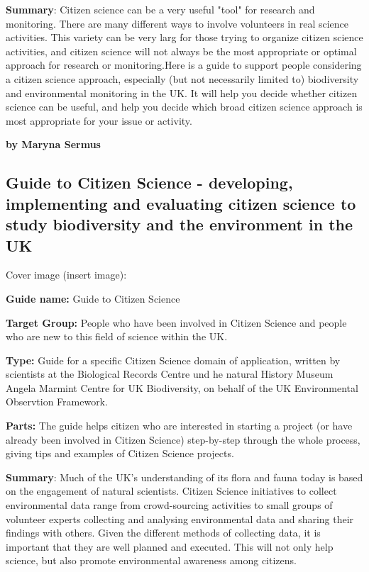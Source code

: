 \documentclass{article}
\begin{document}
\textbf{Summary}: Citizen science can be a very useful "tool" for research and monitoring. There are many different ways to involve volunteers in real science activities. This variety can be very larg for those trying to organize citizen science activities, and citizen science will not always be the most appropriate or optimal approach for research or monitoring.Here is a guide to support people considering a citizen science approach, especially (but not necessarily limited to) biodiversity and environmental monitoring in the UK. It will help you decide whether citizen science can be useful, and help you decide which broad citizen science approach is most appropriate for your issue or activity. 


\textbf{by Maryna Sermus}


\subsection{Guide to Citizen Science - developing, implementing and evaluating citizen science to study biodiversity and the environment in the UK}\label{H3514415}



Cover image (insert image):


\textbf{Guide name: }Guide to Citizen Science\textbf{ } \autocite{tweddle_guide_2012}


\textbf{Target Group: }People who have been involved in Citizen Science and people who are new to this field of science within the UK.


\textbf{Type: }Guide for a specific Citizen Science domain of application, written by scientists at the Biological Records Centre und he natural History Museum Angela Marmint Centre for UK Biodiversity, on behalf of the UK Environmental Observtion Framework.


\textbf{Parts: }The guide helps citizen who are interested in starting a project (or have already been involved in Citizen Science) step-by-step through the whole process, giving tips and examples of Citizen Science projects.


\textbf{Summary}: Much of the UK's understanding of its flora and fauna today is based on the engagement of natural scientists. Citizen Science initiatives to collect environmental data range from crowd-sourcing activities to small groups of volunteer experts collecting and analysing environmental data and sharing their findings with others. Given the different methods of collecting data, it is important that they are well planned and executed. This will not only help science, but also promote environmental awareness among citizens.
\end{document}
